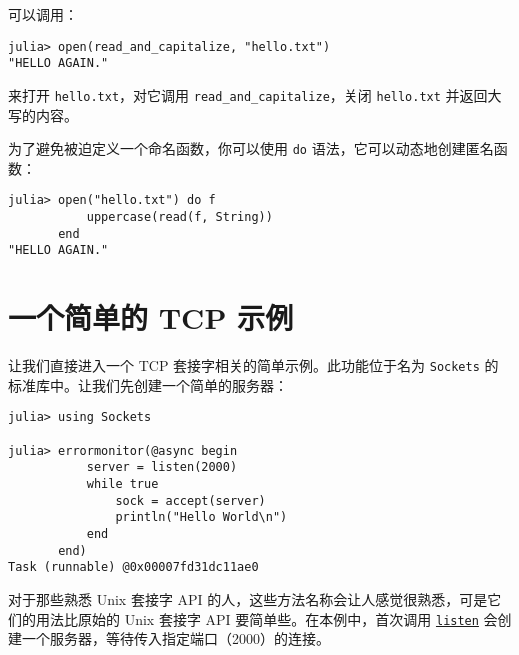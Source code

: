 可以调用：




\begin{verbatim}
julia> open(read_and_capitalize, "hello.txt")
"HELLO AGAIN."
\end{verbatim}



来打开 \texttt{hello.txt}，对它调用 \texttt{read\_and\_capitalize}，关闭 \texttt{hello.txt} 并返回大写的内容。



为了避免被迫定义一个命名函数，你可以使用 \texttt{do} 语法，它可以动态地创建匿名函数：




\begin{verbatim}
julia> open("hello.txt") do f
           uppercase(read(f, String))
       end
"HELLO AGAIN."
\end{verbatim}



\hypertarget{15377875155010529137}{}


\section{一个简单的 TCP 示例}



让我们直接进入一个 TCP 套接字相关的简单示例。此功能位于名为 \texttt{Sockets} 的标准库中。让我们先创建一个简单的服务器：




\begin{verbatim}
julia> using Sockets

julia> errormonitor(@async begin
           server = listen(2000)
           while true
               sock = accept(server)
               println("Hello World\n")
           end
       end)
Task (runnable) @0x00007fd31dc11ae0
\end{verbatim}



对于那些熟悉 Unix 套接字 API 的人，这些方法名称会让人感觉很熟悉，可是它们的用法比原始的 Unix 套接字 API 要简单些。在本例中，首次调用 \hyperlink{780704944207038170}{\texttt{listen}} 会创建一个服务器，等待传入指定端口（2000）的连接。




